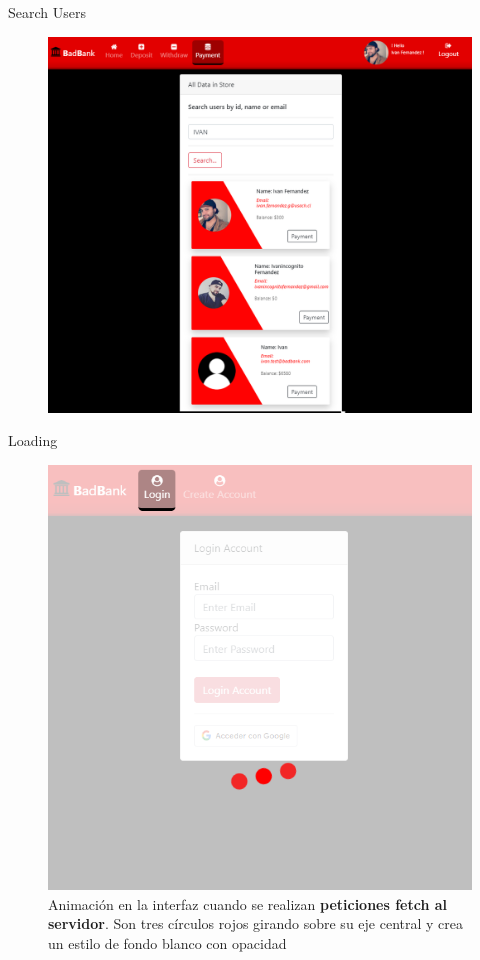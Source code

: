 \documentclass[xcolor=pdftex,dvipsnames,table]{beamer}
\begin{document}
\begin{frame}{Search Users}
    \begin{figure}[htb]
        \centering
        \captionsetup{justification=centering,margin=0.3cm}
        \includegraphics[width=0.8\linewidth]{extras/serch.png}
    \end{figure} 
\end{frame}
\begin{frame}{Loading}
    \begin{figure}[htb]
        \centering
        \captionsetup{justification=centering,margin=0.3cm}
        \includegraphics[width=0.5\linewidth]{extras/LOADIN.png}
        \caption*{\footnotesize  Animación en la interfaz cuando se realizan  \textbf{peticiones fetch al servidor}. Son tres círculos rojos girando sobre su eje central y crea un estilo de fondo blanco con opacidad }
    \end{figure} 
\end{frame}
\end{document}
